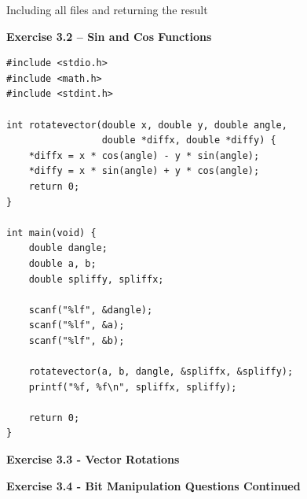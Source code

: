 \vspace{-2em}

Including all files and returning the result

\textbf{Exercise 3.2 – Sin and Cos Functions}

\begin{lstlisting}
#include <stdio.h>
#include <math.h>
#include <stdint.h>

int rotatevector(double x, double y, double angle,
                 double *diffx, double *diffy) {
    *diffx = x * cos(angle) - y * sin(angle);
    *diffy = x * sin(angle) + y * cos(angle);
    return 0;
}

int main(void) {
    double dangle;
    double a, b;
    double spliffy, spliffx;

    scanf("%lf", &dangle);
    scanf("%lf", &a);
    scanf("%lf", &b);

    rotatevector(a, b, dangle, &spliffx, &spliffy);
    printf("%f, %f\n", spliffx, spliffy);

    return 0;
}
\end{lstlisting}

\textbf{Exercise 3.3 - Vector Rotations}

\textbf{Exercise 3.4 - Bit Manipulation Questions Continued}


